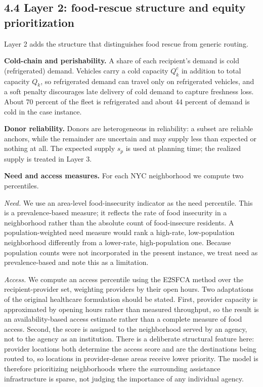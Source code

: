 \documentclass[
  11pt,
]{article}
\begin{document}
\subsection{4.4 Layer 2: food-rescue structure and equity
prioritization}\label{layer-2-food-rescue-structure-and-equity-prioritization}

Layer 2 adds the structure that distinguishes food rescue from generic
routing.

\textbf{Cold-chain and perishability.} A share of each recipient's
demand is cold (refrigerated) demand. Vehicles carry a cold capacity
\(Q^{c}_k\) in addition to total capacity \(Q_k\), so refrigerated
demand can travel only on refrigerated vehicles, and a soft penalty
discourages late delivery of cold demand to capture freshness loss.
About 70 percent of the fleet is refrigerated and about 44 percent of
demand is cold in the case instance.

\textbf{Donor reliability.} Donors are heterogeneous in reliability: a
subset are reliable anchors, while the remainder are uncertain and may
supply less than expected or nothing at all. The expected supply \(s_p\)
is used at planning time; the realized supply is treated in Layer 3.

\textbf{Need and access measures.} For each NYC neighborhood we compute
two percentiles.

\emph{Need.} We use an area-level food-insecurity indicator as the need
percentile. This is a prevalence-based measure; it reflects the rate of
food insecurity in a neighborhood rather than the absolute count of
food-insecure residents. A population-weighted need measure would rank a
high-rate, low-population neighborhood differently from a lower-rate,
high-population one. Because population counts were not incorporated in
the present instance, we treat need as prevalence-based and note this as
a limitation.

\emph{Access.} We compute an access percentile using the E2SFCA method
over the recipient-provider set, weighting providers by their open
hours. Two adaptations of the original healthcare formulation should be
stated. First, provider capacity is approximated by opening hours rather
than measured throughput, so the result is an availability-based access
estimate rather than a complete measure of food access. Second, the
score is assigned to the neighborhood served by an agency, not to the
agency as an institution. There is a deliberate structural feature here:
provider locations both determine the access score and are the
destinations being routed to, so locations in provider-dense areas
receive lower priority. The model is therefore prioritizing
neighborhoods where the surrounding assistance infrastructure is sparse,
not judging the importance of any individual agency.
\end{document}
